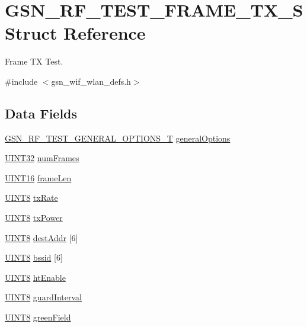 \hypertarget{a00187}{
\section{GSN\_\-RF\_\-TEST\_\-FRAME\_\-TX\_\-S Struct Reference}
\label{a00187}
}


Frame TX Test.  




{\ttfamily \#include $<$gsn\_\-wif\_\-wlan\_\-defs.h$>$}

\subsection*{Data Fields}
\begin{DoxyCompactItemize}
\item 
\hyperlink{a00188}{GSN\_\-RF\_\-TEST\_\-GENERAL\_\-OPTIONS\_\-T} \hyperlink{a00187_a5e4e9e8d2b76fbb6bdf201c4aeddd60d}{generalOptions}
\item 
\hyperlink{a00660_gae1e6edbbc26d6fbc71a90190d0266018}{UINT32} \hyperlink{a00187_a4e13c180765684684613fee7c7d86666}{numFrames}
\item 
\hyperlink{a00660_ga09f1a1fb2293e33483cc8d44aefb1eb1}{UINT16} \hyperlink{a00187_ad7d37183f86bdd7a3c11db21c3301b32}{frameLen}
\item 
\hyperlink{a00660_gab27e9918b538ce9d8ca692479b375b6a}{UINT8} \hyperlink{a00187_ab1ab70812caf37881581c451398a6f9c}{txRate}
\item 
\hyperlink{a00660_gab27e9918b538ce9d8ca692479b375b6a}{UINT8} \hyperlink{a00187_a763a8a049f451428e05835d3c3b466cd}{txPower}
\item 
\hyperlink{a00660_gab27e9918b538ce9d8ca692479b375b6a}{UINT8} \hyperlink{a00187_a8b13c9d995b3a022c8481b2e0c972ae0}{destAddr} \mbox{[}6\mbox{]}
\item 
\hyperlink{a00660_gab27e9918b538ce9d8ca692479b375b6a}{UINT8} \hyperlink{a00187_af1eb240ad4299a104d0bf3fddcabbb95}{bssid} \mbox{[}6\mbox{]}
\item 
\hyperlink{a00660_gab27e9918b538ce9d8ca692479b375b6a}{UINT8} \hyperlink{a00187_aa9dd146b0056ea098e9be601c2dc23e8}{htEnable}
\item 
\hyperlink{a00660_gab27e9918b538ce9d8ca692479b375b6a}{UINT8} \hyperlink{a00187_ab98fc9858671817369884eb76059060c}{guardInterval}
\item 
\hyperlink{a00660_gab27e9918b538ce9d8ca692479b375b6a}{UINT8} \hyperlink{a00187_a1616fda9db33a672fcd0096af9760f68}{greenField}

\end{DoxyCompactItemize}
